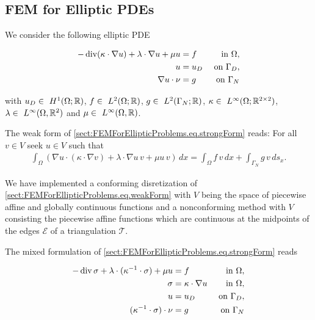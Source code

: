\subsection{FEM for Elliptic PDEs}
We consider the following elliptic PDE

\begin{align}
\label{sect:FEMForEllipticProblems.eq.strongForm}
  -\operatorname{div}(\kappa\cdot\nabla u) + \lambda\cdot\nabla u + \mu u &= f &\text{in } \Omega, \\
  u &= u_D &\text{ on } \Gamma_D, \\
  \nabla u\cdot\nu &= g &\text{ on } \Gamma_N
\end{align}

with $u_D\in~H^1(\Omega;\mathbb{R})$, $f\in~L^2(\Omega;\mathbb{R})$, $g\in~L^2(\Gamma_N;\mathbb{R})$, $\kappa\in~L^\infty(\Omega;\mathbb{R}^{2\times 2})$, $\lambda\in~L^{\infty}(\Omega,\mathbb{R}^2)$ and $\mu\in~L^\infty(\Omega,\mathbb{R})$. 

\bigskip

\noindent The weak form of \eqref{sect:FEMForEllipticProblems.eq.strongForm} reads: For all $v\in V$ seek $u\in V$ such that
\begin{align}
\label{sect:FEMForEllipticProblems.eq.weakForm}
	\int_\Omega \left( \nabla u\cdot(\kappa\cdot\nabla v) + \lambda\cdot\nabla u\,v + \mu u\,v\right )\,dx = \int_\Omega f\,v\,dx + \int_{\Gamma_N} g\,v\,ds_x.
\end{align}

\bigskip

We have implemented a conforming disretization of \eqref{sect:FEMForEllipticProblems.eq.weakForm} with $V$ being the space of piecewise affine and globally continuous functions and a nonconforming method with $V$ consisting the piecewise affine functions which are continuous at the midpoints of the edges $\mathcal{E}$ of a triangulation $\mathcal{T}$.

\bigskip

The mixed formulation of \eqref{sect:FEMForEllipticProblems.eq.strongForm} reads

\begin{align}
\label{sect:FEMForEllipticProblems.eq.mixedStrongForm}
  -\operatorname{div}\sigma + \lambda\cdot(\kappa^{-1}\cdot\sigma) + \mu u &= f &\text{in } \Omega, \\
  \sigma &= \kappa\cdot\nabla u &\text{in } \Omega,\\
  u &= u_D &\text{ on } \Gamma_D, \\
  (\kappa^{-1}\cdot\sigma)\cdot\nu &= g &\text{ on } \Gamma_N
\end{align}

